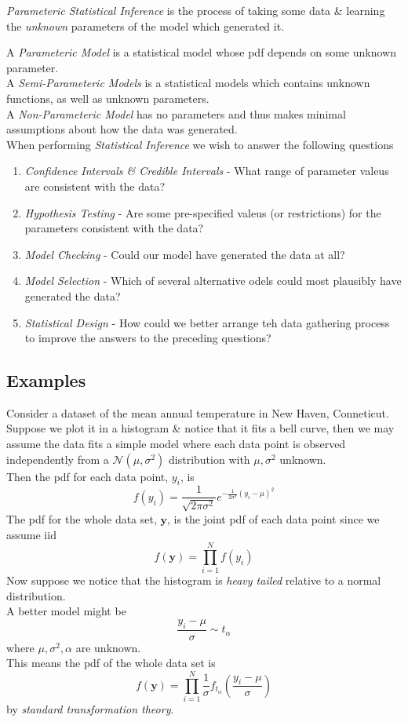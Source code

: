 \documentclass[11pt,a4paper]{article}
\begin{document}
\textit{Parameteric Statistical Inference} is the process of taking some data \& learning the \textit{unknown} parameters of the model which generated it.

A \textit{Parameteric Model} is a statistical model whose pdf depends on some unknown parameter.\\
A \textit{Semi-Parameteric Models} is a statistical models which contains unknown functions, as well as unknown parameters.\\
A \textit{Non-Parameteric Model} has no parameters and thus makes minimal assumptions about how the data was generated.\\

When performing \textit{Statistical Inference} we wish to answer the following questions
\begin{enumerate}
	\item \textit{Confidence Intervals \& Credible Intervals} - What range of parameter valeus are consistent with the data?
	\item \textit{Hypothesis Testing} - Are some pre-specified valeus (or restrictions) for the parameters consistent with the data?
	\item \textit{Model Checking} - Could our model have generated the data at all?
	\item \textit{Model Selection} - Which of several alternative odels could most plausibly have generated the data?
	\item \textit{Statistical Design} - How could we better arrange teh data gathering process to improve the answers to the preceding questions?
\end{enumerate}

\subsection{Examples}

Consider a dataset of the mean annual temperature in New Haven, Conneticut.\\
Suppose we plot it in a histogram \& notice that it fits a bell curve, then we may assume the data fits a simple model where each data point is observed independently from a $\mathcal{N}(\mu,\sigma^2)$ distribution with $\mu,\sigma^2$ unknown.\\
Then the pdf for each data point, $y_i$, is
$$f(y_i)=\frac{1}{\sqrt{2\pi\sigma^2}}e^{-\frac1{2\sigma^2}(y_i-\mu)^2}$$
The pdf for the whole data set, $\textbf{y}$, is the joint pdf of each data point since we assume iid
$$f(\textbf{y})=\prod_{i=1}^Nf(y_i)$$
Now suppose we notice that the histogram is \textit{heavy tailed} relative to a normal distribution.\\
A better model might be
$$\frac{y_i-\mu}\sigma\sim t_\alpha$$
where $\mu,\sigma^2,\alpha$ are unknown.\\
This means the pdf of the whole data set is
$$f(\textbf{y})=\prod_{i=1}^N\frac{1}{\sigma}f_{t_\alpha}\left(\frac{y_i-\mu}{\sigma}\right)$$
by \textit{standard transformation theory}.\\
\end{document}
